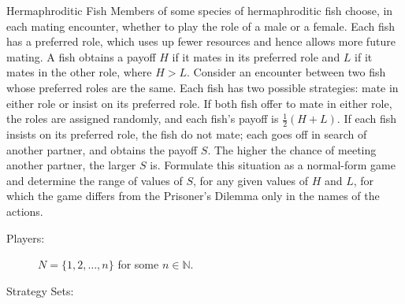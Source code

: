 \documentclass[8pt]{extarticle}
\begin{document}
  \begin{problem}{Hermaphroditic Fish}
    Members of some species of hermaphroditic fish choose, in each mating encounter, whether to play the role of a male or a female. Each fish has a preferred role, which uses up fewer resources and hence allows more future mating. A fish obtains a payoff $H$ if it mates in its preferred role and $L$ if it mates in the other role, where $H>L$. Consider an encounter between two fish whose preferred roles are the same. Each fish has two possible strategies: mate in either role or insist on its preferred role. If both fish offer to mate in either role, the roles are assigned randomly, and each fish's payoff is $\frac{1}{2}(H+L)$. If each fish insists on its preferred role, the fish do not mate; each goes off in search of another partner, and obtains the payoff $S$. The higher the chance of meeting another partner, the larger $S$ is. Formulate this situation as a normal-form game and determine the range of values of $S$, for any given values of $H$ and $L$, for which the game differs from the Prisoner's Dilemma only in the names of the actions.
    \tcblower
    \begin{description}
      \item[Players:] $N = \{1,2,\dots,n\}$ for some $n\in\mathbb{N}$.
      \item[Strategy Sets:] 
    \end{description}
  \end{problem}
\end{document}
